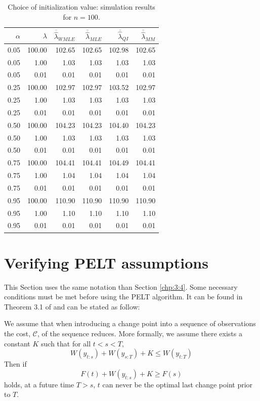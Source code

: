 \begin{appendices}
\begin{table}[ht]
\centering
\begin{tabular}{|rr||rrrr|}
\hline
 $\alpha$ & $\lambda$ & $\overline{\hat\lambda}_{WMLE}$ & $\overline{\hat\lambda}_{MLE}$ & $\overline{\hat\lambda}_{QI}$ & $\overline{\hat\lambda}_{MM}$ \\ 
  \hline
  \hline
0.05 & 100.00 & 102.65 & 102.65 & 102.98 & 102.65 \\ 
  0.05 & 1.00 & 1.03 & 1.03 & 1.03 & 1.03 \\ 
  0.05 & 0.01 & 0.01 & 0.01 & 0.01 & 0.01 \\ 
  0.25 & 100.00 & 102.97 & 102.97 & 103.52 & 102.97 \\ 
  0.25 & 1.00 & 1.03 & 1.03 & 1.03 & 1.03 \\ 
  0.25 & 0.01 & 0.01 & 0.01 & 0.01 & 0.01 \\ 
  0.50 & 100.00 & 104.23 & 104.23 & 104.40 & 104.23 \\ 
  0.50 & 1.00 & 1.03 & 1.03 & 1.03 & 1.03 \\ 
  0.50 & 0.01 & 0.01 & 0.01 & 0.01 & 0.01 \\ 
  0.75 & 100.00 & 104.41 & 104.41 & 104.49 & 104.41 \\ 
  0.75 & 1.00 & 1.04 & 1.04 & 1.04 & 1.04 \\ 
  0.75 & 0.01 & 0.01 & 0.01 & 0.01 & 0.01 \\ 
  0.95 & 100.00 & 110.90 & 110.90 & 110.90 & 110.90 \\ 
  0.95 & 1.00 & 1.10 & 1.10 & 1.10 & 1.10 \\ 
  0.95 & 0.01 & 0.01 & 0.01 & 0.01 & 0.01 \\ 
   \hline
\end{tabular}
\caption{Choice of initialization value: simulation results for $n = 100$.}\label{tab:sim:init2}
\end{table}

\section{Verifying PELT assumptions}\label{app:chap4:3}

This Section uses the same notation than Section \ref{chp:3:4}. Some necessary conditions must be met before using the PELT algorithm. It can be found in Theorem 3.1 of \cite{Killick2012} and can be stated as follow:  
\begin{proposition}
    We assume that  when  introducing a change point into a sequence of observations the  cost, $\mathcal{C}$, of the sequence reduces. More formally, we assume there exists a constant $K$ such that for all $t<s<T$,
    \begin{equation}\label{app:pelt}
      W(y_{t:s}) + W(y_{s:T}) + K \leq W(y_{t:T})  
    \end{equation}
    Then if
    \begin{equation}\label{app:pelt2}
      F(t)+W(y_{t:s})+K \geq F(s)  
    \end{equation}
    holds, at a future time $T>s$, $t$ can never be the optimal last change point prior to $T$.
\end{proposition}


\end{appendices}
